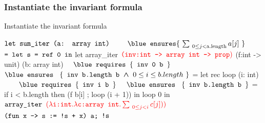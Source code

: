 \subsubsection*{Instantiate the invariant formula}
\begin{frame}[fragile]
{Instantiate the invariant formula}
\begin{footnotesize}
\begin{minipage}[t]{0.3\linewidth}
\begin{whycode} 
   $\color{black}\texttt{let sum\_iter (a: array int)}$
	$\hspace*{2em}\texttt{\blue ensures}\{~\sum_{~0 \leq j < \text{a.length}} a[j]~\}$
   $\color{black}\texttt{=  let s = ref 0 in}$
      let array_iter  $\color{red}\texttt{(inv:int -> array int -> prop})$ 
      (f:int -> unit) (b: array int)
	      $\Noir{\\ \hspace*{1em}\texttt{\blue requires }\{\texttt{ inv 0 b }\} }$
        $\Noir{\\ \hspace*{0em}\texttt{\blue ensures  }~\{\texttt{ inv b.length b}\bwedge 0 \leq i \leq b.length~\}}$ 
      = let rec loop (i: int)
	      $\Noir{\hspace*{2em}\texttt{\blue requires }\{\texttt{ inv i b }\}}$
        $\Noir{\hspace*{1em}\texttt{\blue ensures  }~\{\texttt{ inv b.length b }\}}$
        = if i < b.length 
          then (f b[i] ; loop (i + 1)) 
        in loop 0   
      in $\color{black}\texttt{array\_iter }{\color{red}(\lambda \texttt{i:int}. \lambda \texttt{c:array int}. \sum_{~0\leq j < i} c[j]))}$
                $\color{black}\texttt{(fun x -> s := !s + x) a;}$
     $\color{black}\texttt{!s}$
\end{whycode}
\end{minipage}
\end{footnotesize}
\end{frame}
\addtocounter{framenumber}{-1}
